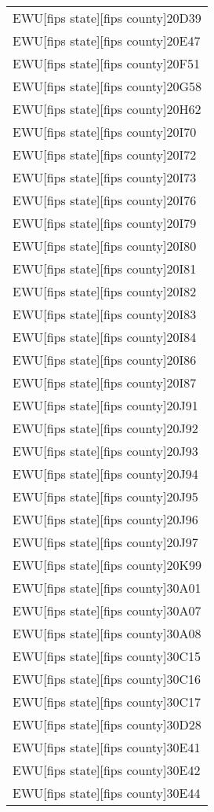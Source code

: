 \begin{supertabular}{l}
EWU[fips state][fips county]20D39\\
EWU[fips state][fips county]20E47\\
EWU[fips state][fips county]20F51\\
EWU[fips state][fips county]20G58\\
EWU[fips state][fips county]20H62\\
EWU[fips state][fips county]20I70\\
EWU[fips state][fips county]20I72\\
EWU[fips state][fips county]20I73\\
EWU[fips state][fips county]20I76\\
EWU[fips state][fips county]20I79\\
EWU[fips state][fips county]20I80\\
EWU[fips state][fips county]20I81\\
EWU[fips state][fips county]20I82\\
EWU[fips state][fips county]20I83\\
EWU[fips state][fips county]20I84\\
EWU[fips state][fips county]20I86\\
EWU[fips state][fips county]20I87\\
EWU[fips state][fips county]20J91\\
EWU[fips state][fips county]20J92\\
EWU[fips state][fips county]20J93\\
EWU[fips state][fips county]20J94\\
EWU[fips state][fips county]20J95\\
EWU[fips state][fips county]20J96\\
EWU[fips state][fips county]20J97\\
EWU[fips state][fips county]20K99\\
EWU[fips state][fips county]30A01\\
EWU[fips state][fips county]30A07\\
EWU[fips state][fips county]30A08\\
EWU[fips state][fips county]30C15\\
EWU[fips state][fips county]30C16\\
EWU[fips state][fips county]30C17\\
EWU[fips state][fips county]30D28\\
EWU[fips state][fips county]30E41\\
EWU[fips state][fips county]30E42\\
EWU[fips state][fips county]30E44\\

\end{supertabular}

